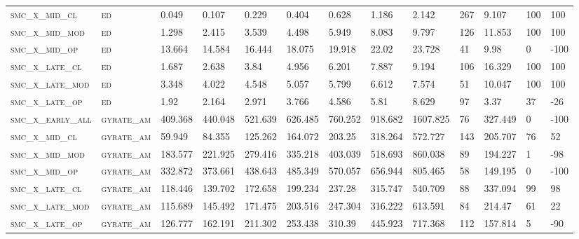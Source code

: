 \begin{landscape}
\begin{center}
\begin{footnotesize}
\begin{longtable}{lllllllllllll}
\textsc{smc\_x\_mid\_cl   } & \textsc{ed        }   & 0.049    & 0.107    & 0.229    & 0.404    & 0.628    & 1.186    & 2.142    & 267 & 9.107    & 100 & 100    \\
\textsc{smc\_x\_mid\_mod  } & \textsc{ed        }   & 1.298    & 2.415    & 3.539    & 4.498    & 5.949    & 8.083    & 9.797    & 126 & 11.853   & 100 & 100    \\
\textsc{smc\_x\_mid\_op   } & \textsc{ed        }   & 13.664   & 14.584   & 16.444   & 18.075   & 19.918   & 22.02    & 23.728   & 41  & 9.98     & 0   & -100   \\
\textsc{smc\_x\_late\_cl  } & \textsc{ed        }   & 1.687    & 2.638    & 3.84     & 4.956    & 6.201    & 7.887    & 9.194    & 106 & 16.329   & 100 & 100    \\
\textsc{smc\_x\_late\_mod } & \textsc{ed        }   & 3.348    & 4.022    & 4.548    & 5.057    & 5.799    & 6.612    & 7.574    & 51  & 10.047   & 100 & 100    \\
\textsc{smc\_x\_late\_op  } & \textsc{ed        }   & 1.92     & 2.164    & 2.971    & 3.766    & 4.586    & 5.81     & 8.629    & 97  & 3.37     & 37  & -26    \\
\textsc{smc\_x\_early\_all} & \textsc{gyrate\_am}   & 409.368  & 440.048  & 521.639  & 626.485  & 760.252  & 918.682  & 1607.825 & 76  & 327.449  & 0   & -100   \\
\textsc{smc\_x\_mid\_cl   } & \textsc{gyrate\_am}   & 59.949   & 84.355   & 125.262  & 164.072  & 203.25   & 318.264  & 572.727  & 143 & 205.707  & 76  & 52     \\
\textsc{smc\_x\_mid\_mod  } & \textsc{gyrate\_am}   & 183.577  & 221.925  & 279.416  & 335.218  & 403.039  & 518.693  & 860.038  & 89  & 194.227  & 1   & -98    \\
\textsc{smc\_x\_mid\_op   } & \textsc{gyrate\_am}   & 332.872  & 373.661  & 438.643  & 485.349  & 570.057  & 656.944  & 805.465  & 58  & 149.195  & 0   & -100   \\
\textsc{smc\_x\_late\_cl  } & \textsc{gyrate\_am}   & 118.446  & 139.702  & 172.658  & 199.234  & 237.28   & 315.747  & 540.709  & 88  & 337.094  & 99  & 98     \\
\textsc{smc\_x\_late\_mod } & \textsc{gyrate\_am}   & 115.689  & 145.492  & 171.475  & 203.516  & 247.304  & 316.222  & 613.591  & 84  & 214.47   & 61  & 22     \\
\textsc{smc\_x\_late\_op  } & \textsc{gyrate\_am}   & 126.777  & 162.191  & 211.302  & 253.438  & 310.39   & 445.923  & 717.368  & 112 & 157.814  & 5   & -90    \\

\end{longtable}
\end{footnotesize}
\end{center}
\end{landscape}
